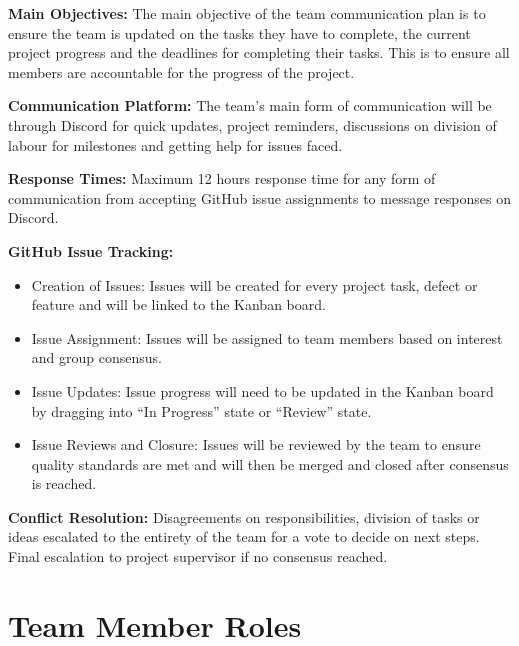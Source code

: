 \documentclass{article}
\begin{document}
\noindent\textbf{Main Objectives:} The main objective of the team communication plan is to ensure the team is updated on the tasks they have to complete, the current project progress and the deadlines for completing their tasks. This is to ensure all members are accountable for the progress of the project.\vspace{1em}

\textbf{Communication Platform:} The team's main form of communication will be through Discord for quick updates, project reminders, discussions on division of labour for milestones and getting help for issues faced.\vspace{1em}

\textbf{Response Times:} Maximum 12 hours response time for any form of communication from accepting GitHub issue assignments to message responses on Discord.\vspace{1em}

\textbf{GitHub Issue Tracking:}
\begin{itemize}
    \item Creation of Issues: Issues will be created for every project task, defect or feature and will be linked to the Kanban board.
    \item Issue Assignment: Issues will be assigned to team members based on interest and group consensus. 
    \item Issue Updates: Issue progress will need to be updated in the Kanban board by dragging into “In Progress” state or “Review” state.
    \item Issue Reviews and Closure: Issues will be reviewed by the team to ensure quality standards are met and will then be merged and closed after consensus is reached.
\end{itemize}

\textbf{Conflict Resolution:} Disagreements on responsibilities, division of tasks or ideas escalated to the entirety of the team for a vote to decide on next steps. Final escalation to project supervisor if no consensus reached.


\section{Team Member Roles}
\end{document}
